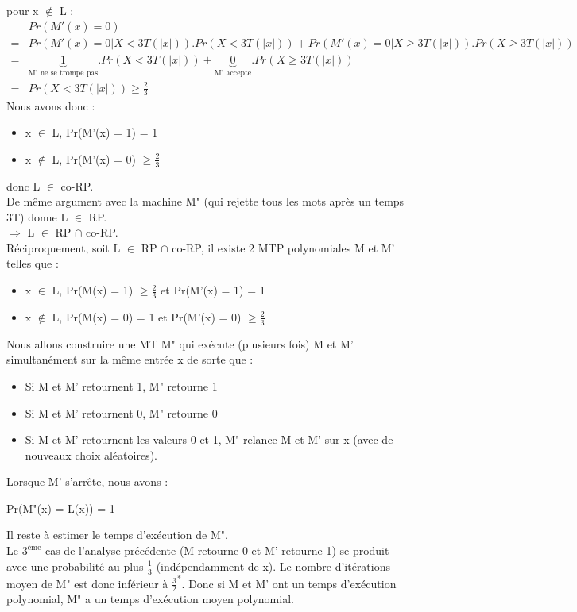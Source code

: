 \documentclass[12pt,a4paper]{article}
\begin{document}
pour x $\notin$ L :
\begin{equation}
\begin{split}\nonumber
& Pr(M'(x) = 0)\\
=& Pr(M'(x) = 0 | X < 3T(|x|)).Pr(X < 3T(|x|)) + Pr(M'(x) = 0 | X \geq 3T(|x|)).Pr(X \geq 3T(|x|))\\
=&\underbrace{1}_{\text{M' ne se trompe pas}}.Pr(X < 3T(|x|)) + \underbrace{0}_{\text{M' accepte}}.Pr(X \geq 3T(|x|))\\
=& Pr(X < 3T(|x|)) \geq \frac{2}{3}
\end{split}
\end{equation}
Nous avons donc :
\begin{itemize}
	\item x $\in$ L, Pr(M'(x) = 1) = 1
	\item x $\notin$ L, Pr(M'(x) = 0) $\geq \frac{2}{3}$
\end{itemize}
donc L $\in$ co-RP.\\
De même argument avec la machine M" (qui rejette tous les mots après un temps 3T) donne L $\in$ RP.\\
$\Longrightarrow$ L $\in$ RP $\cap$ co-RP.\\
Réciproquement, soit L $\in$ RP $\cap$ co-RP, il existe 2 MTP polynomiales M et M' telles que :
\begin{itemize}
	\item x $\in$ L, Pr(M(x) = 1) $\geq \frac{2}{3}$ et Pr(M'(x) = 1) = 1
	\item x $\notin$ L, Pr(M(x) = 0) = 1 et Pr(M'(x) = 0) $\geq \frac{2}{3}$
\end{itemize}
Nous allons construire une MT M" qui exécute (plusieurs fois) M et M' simultanément sur la même entrée x de sorte que :
\begin{itemize}
	\item Si M et M' retournent 1, M" retourne 1
	\item Si M et M' retournent 0, M" retourne 0
	\item Si M et M' retournent les valeurs 0 et 1, M" relance M et M' sur x (avec de nouveaux choix aléatoires).
\end{itemize}
Lorsque M' s'arrête, nous avons :
\begin{center}
	Pr(M"(x) = L(x)) = 1
\end{center}
Il reste à estimer le temps d'exécution de M".\\
Le $3^\text{ème}$ cas de l'analyse précédente (M retourne 0 et M' retourne 1) se produit avec une probabilité au plus $\frac{1}{3}$ (indépendamment de x). Le nombre d'itérations moyen de M" est donc inférieur à $\frac{3}{2}^*$. Donc si M et M' ont un temps d'exécution polynomial, M" a un temps d'exécution moyen polynomial.\\
\end{document}
